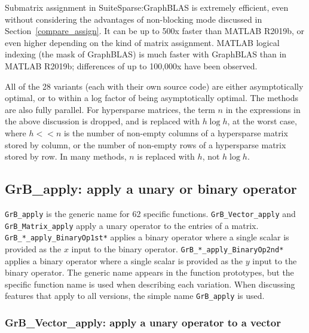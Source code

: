 \documentclass[12pt]{article}
\begin{document}

Submatrix assignment in SuiteSparse:GraphBLAS is extremely efficient, even
without considering the advantages of non-blocking mode discussed in
Section~\ref{compare_assign}.  It can be up to 500x faster than MATLAB
R2019b, or even higher depending on the kind of matrix assignment.
MATLAB logical indexing (the mask of GraphBLAS) is much faster with
GraphBLAS than in MATLAB R2019b; differences of up to 100,000x have been
observed.

All of the 28 variants (each with their own source code) are either
asymptotically optimal, or to within a log factor of being asymptotically
optimal.  The methods are also fully parallel.  For hypersparse matrices, the
term $n$ in the expressions in the above discussion is dropped, and is replaced
with $h \log h$, at the worst case, where $h << n$ is the number of non-empty
columns of a hypersparse matrix stored by column, or the number of non-empty
rows of a hypersparse matrix stored by row.  In many methods, $n$ is replaced
with $h$, not $h \log h$.

\newpage
\subsection{{\sf GrB\_apply:} apply a unary or binary operator} %
\label{apply}

\verb'GrB_apply' is the generic name for 62 specific functions.
\verb'GrB_Vector_apply' and \verb'GrB_Matrix_apply' apply a unary operator to
the entries of a matrix.  \verb'GrB_*_apply_BinaryOp1st*' applies a binary
operator where a single scalar is provided as the $x$ input to the binary
operator.  \verb'GrB_*_apply_BinaryOp2nd*' applies a binary operator where a
single scalar is provided as the $y$ input to the binary operator.  The generic
name appears in the function prototypes, but the specific function name is used
when describing each variation.  When discussing features that apply to all
versions, the simple name \verb'GrB_apply' is used.

\subsubsection{{\sf GrB\_Vector\_apply:} apply a unary operator to a vector}
\label{apply_vector}
\end{document}
